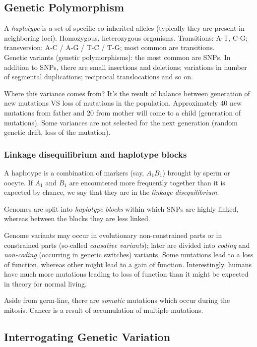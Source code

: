 \documentclass[main.tex]{subfiles}
\begin{document}
\subsection{Genetic Polymorphism}

A \emph{haplotype} is a set of  specific co-inherited alleles (typically they are present in neighboring loci).
Homozygous, heterozygous organisms.
Transitions: A-T, C-G; transversion: A-C / A-G / T-C / T-G; most common are transitions. \\

Genetic variants (genetic polymorphisms): the most common are SNPs.
In addition to SNPs, there are small insertions and deletions; variations in number of segmental duplications; reciprocal translocations and so on.

Where this variance comes from?
It's the result of balance between generation of new mutations VS loss of mutations in the population.
Approximately 40 new mutations from father and 20 from mother will come to a child (generation of mutations).
Some variances are not selected for the next generation (random genetic drift, loss of the mutation).

\subsubsection{Linkage disequilibrium and haplotype blocks}

A haplotype is a combination of markers (say, $A_1 B_1$) brought by sperm or oocyte.
If $A_1$ and $B_1$ are encountered more frequently together than it is expected by chance, we say that they are in the \emph{linkage disequilibrium}.

Genomes are split into \emph{haplotype blocks} within which SNPs are highly linked, whereas between the blocks they are less linked.

Genome variants may occur in evolutionary non-constrained parts or in constrained parts (so-called \emph{causative variants}); later are divided into \emph{coding} and \emph{non-coding} (occurring in genetic switches) variants.
Some mutations lead to a loss of function, whereas other might lead to a gain of function.
Interestingly, humans have much more mutations leading to loss of function than it might be expected in theory for normal living.

Aside from germ-line, there are \emph{somatic} mutations which occur during the mitosis.
Cancer is a result of accumulation of multiple mutations.

\subsection{Interrogating Genetic Variation}
\end{document}
